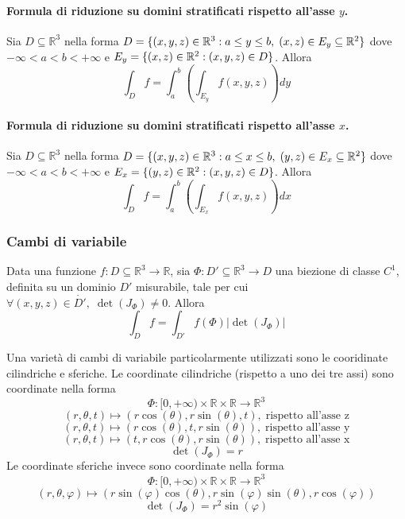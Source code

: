             \paragraph*{Formula di riduzione su domini stratificati rispetto all'asse $y$.}
                Sia $D \subseteq \mathbb{R}^{3}$ nella forma $D = \{(x, y, z) \in \mathbb{R}^{3} \mathrel{:} a \leq y \leq b, \; (x, z) \in E_{y} \subseteq \mathbb{R}^{2}\}$ dove $-\infty < a < b < +\infty$ e $E_{y} = \{ (x, z) \in \mathbb{R}^{2} \mathrel{:} (x, y, z) \in D\}$.
                Allora
                \[
                    \int_{D} f = \int_{a}^{b} \left( \int_{E_{y}} f(x, y, z) \right) dy
                \]

            \paragraph*{Formula di riduzione su domini stratificati rispetto all'asse $x$.}
                Sia $D \subseteq \mathbb{R}^{3}$ nella forma $D = \{(x, y, z) \in \mathbb{R}^{3} \mathrel{:} a \leq x \leq b, \; (y, z) \in E_{x} \subseteq \mathbb{R}^{2}\}$ dove $-\infty < a < b < +\infty$ e $E_{x} = \{ (y, z) \in \mathbb{R}^{2} \mathrel{:} (x, y, z) \in D\}$.
                Allora
                \[
                    \int_{D} f = \int_{a}^{b} \left( \int_{E_{x}} f(x, y, z) \right) dx
                \]

        \subsubsection{Cambi di variabile}
            Data una funzione $f: D \subseteq \mathbb{R}^{3} \rightarrow \mathbb{R}$, sia $\Phi: D' \subseteq \mathbb{R}^{3} \rightarrow D$ una biezione di classe $C^{1}$, definita su un dominio $D'$ misurabile, tale per cui $\forall (x, y, z) \in \mathring{D'}, \; \det(J_{\Phi}) \neq 0$.
            Allora
            \[
                \int_{D} f = \int_{D'} f(\Phi) |\det(J_{\Phi})|
            \]

            Una varietà di cambi di variabile particolarmente utilizzati sono le cooridinate cilindriche e sferiche.
            Le coordinate cilindriche (rispetto a uno dei tre assi) sono coordinate nella forma
            \[
                \Phi: [0, +\infty) \times \mathbb{R} \times \mathbb{R} \rightarrow \mathbb{R}^{3}
            \]
            \[
                (r, \theta, t) \mapsto (r \cos(\theta), r \sin (\theta), t), \; \text{rispetto all'asse z}
            \]
            \[
                (r, \theta, t) \mapsto (r \cos(\theta), t, r \sin (\theta)), \; \text{rispetto all'asse y}
            \]
            \[
                (r, \theta, t) \mapsto (t, r \cos(\theta), r \sin(\theta)), \; \text{rispetto all'asse x}
            \]
            \[
                \det(J_{\Phi}) = r
            \]
            Le coordinate sferiche invece sono coordinate nella forma
            \[
                \Phi: [0, +\infty) \times \mathbb{R} \times \mathbb{R} \rightarrow \mathbb{R}^{3}
            \]
            \[
                (r, \theta, \varphi) \mapsto (r \sin(\varphi)\cos(\theta), r \sin(\varphi)\sin(\theta), r \cos(\varphi))
            \]
            \[
                \det(J_{\Phi}) = r^{2} \sin(\varphi)
            \]

